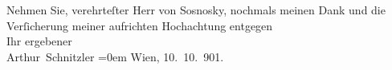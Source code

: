 \pstart
           Nehmen Sie, verehrteſter Herr von Sosnosky, nochmals meinen Dank und die
               Verſicherung meiner aufrichten Hochachtung entgegen {\\[\baselineskip]}Ihr ergebener{\\[\baselineskip]}\spacefill\mbox{Arthur Schnitzler}\pend
           \leftskip=0em{}
\pstart
           Wien, 10. 10. 901.\pend
           \endnumbering{}
\begin{anhang}
\end{anhang}\newcommand{\dateiname}{L04235}\newcommand{\titel}{Arthur Schnitzler an Theodor von Sosnosky, 10. 10. 1901}\newcommand{\editorInnen}{Herausgegeben von Jahnke, SelmaMüller, Martin Anton}
